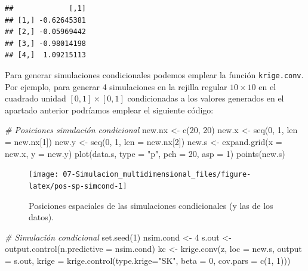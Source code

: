 \documentclass[
]{book}
\newenvironment{Shaded}{\begin{snugshade}}{\end{snugshade}}
\newcommand{\AttributeTok}[1]{\textcolor[rgb]{0.77,0.63,0.00}{#1}}
\newcommand{\CommentTok}[1]{\textcolor[rgb]{0.56,0.35,0.01}{\textit{#1}}}
\newcommand{\DecValTok}[1]{\textcolor[rgb]{0.00,0.00,0.81}{#1}}
\newcommand{\FunctionTok}[1]{\textcolor[rgb]{0.00,0.00,0.00}{#1}}
\newcommand{\NormalTok}[1]{#1}
\newcommand{\OtherTok}[1]{\textcolor[rgb]{0.56,0.35,0.01}{#1}}
\newcommand{\StringTok}[1]{\textcolor[rgb]{0.31,0.60,0.02}{#1}}
\theoremstyle{break}
\theoremstyle{definition}
\theoremstyle{definition}
\theoremstyle{definition}
\theoremstyle{definition}
\theoremstyle{remark}
\begin{document}
\begin{verbatim}
##             [,1]
## [1,] -0.62645381
## [2,] -0.05969442
## [3,] -0.98014198
## [4,]  1.09215113
\end{verbatim}

Para generar simulaciones condicionales podemos emplear la función \texttt{krige.conv}.
Por ejemplo, para generar 4 simulaciones en la rejilla regular \(10\times10\) en el cuadrado unidad \([0,1] \times [0,1]\) condicionadas a los valores generados en el apartado anterior podríamos emplear el siguiente código:

\begin{Shaded}
\begin{Highlighting}[]
\CommentTok{\# Posiciones simulación condicional}
\NormalTok{new.nx }\OtherTok{\textless{}{-}} \FunctionTok{c}\NormalTok{(}\DecValTok{20}\NormalTok{, }\DecValTok{20}\NormalTok{)}
\NormalTok{new.x }\OtherTok{\textless{}{-}} \FunctionTok{seq}\NormalTok{(}\DecValTok{0}\NormalTok{, }\DecValTok{1}\NormalTok{, }\AttributeTok{len =}\NormalTok{ new.nx[}\DecValTok{1}\NormalTok{])}
\NormalTok{new.y }\OtherTok{\textless{}{-}} \FunctionTok{seq}\NormalTok{(}\DecValTok{0}\NormalTok{, }\DecValTok{1}\NormalTok{, }\AttributeTok{len =}\NormalTok{ new.nx[}\DecValTok{2}\NormalTok{])}
\NormalTok{new.s }\OtherTok{\textless{}{-}} \FunctionTok{expand.grid}\NormalTok{(}\AttributeTok{x =}\NormalTok{ new.x, }\AttributeTok{y =}\NormalTok{ new.y)}
\FunctionTok{plot}\NormalTok{(data.s, }\AttributeTok{type =} \StringTok{"p"}\NormalTok{, }\AttributeTok{pch =} \DecValTok{20}\NormalTok{, }\AttributeTok{asp =} \DecValTok{1}\NormalTok{)}
\FunctionTok{points}\NormalTok{(new.s)}
\end{Highlighting}
\end{Shaded}

\begin{figure}[!htb]

{\centering \texttt{[image: 07-Simulacion\_multidimensional\_files/figure-latex/pos-sp-simcond-1]} 

}

\caption{Posiciones espaciales de las simulaciones condicionales (y las de los datos).}\label{fig:pos-sp-simcond}
\end{figure}

\begin{Shaded}
\begin{Highlighting}[]
\CommentTok{\# Simulación condicional}
\FunctionTok{set.seed}\NormalTok{(}\DecValTok{1}\NormalTok{)}
\NormalTok{nsim.cond }\OtherTok{\textless{}{-}} \DecValTok{4}
\NormalTok{s.out }\OtherTok{\textless{}{-}} \FunctionTok{output.control}\NormalTok{(}\AttributeTok{n.predictive =}\NormalTok{ nsim.cond)}
\NormalTok{kc }\OtherTok{\textless{}{-}} \FunctionTok{krige.conv}\NormalTok{(z, }\AttributeTok{loc =}\NormalTok{ new.s, }\AttributeTok{output =}\NormalTok{ s.out,}
                 \AttributeTok{krige =} \FunctionTok{krige.control}\NormalTok{(}\AttributeTok{type.krige=}\StringTok{"SK"}\NormalTok{, }\AttributeTok{beta =} \DecValTok{0}\NormalTok{, }\AttributeTok{cov.pars =} \FunctionTok{c}\NormalTok{(}\DecValTok{1}\NormalTok{, }\DecValTok{1}\NormalTok{)))}
\end{Highlighting}
\end{Shaded}
\end{document}
